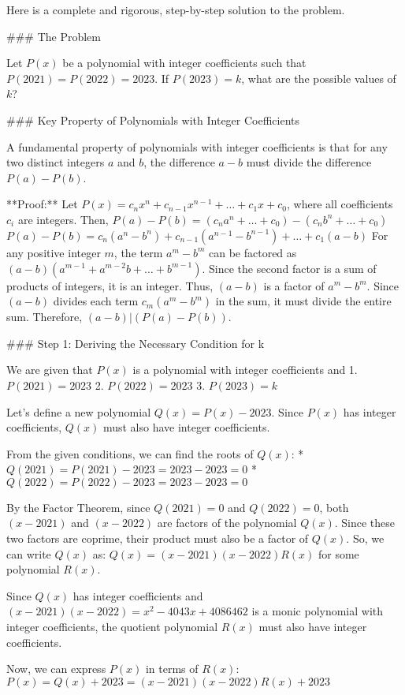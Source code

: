 Here is a complete and rigorous, step-by-step solution to the problem.

### The Problem

Let $P(x)$ be a polynomial with integer coefficients such that $P(2021) = P(2022) = 2023$. If $P(2023) = k$, what are the possible values of $k$?

### Key Property of Polynomials with Integer Coefficients

A fundamental property of polynomials with integer coefficients is that for any two distinct integers $a$ and $b$, the difference $a-b$ must divide the difference $P(a) - P(b)$.

**Proof:** Let $P(x) = c_n x^n + c_{n-1} x^{n-1} + \dots + c_1 x + c_0$, where all coefficients $c_i$ are integers.
Then,
$P(a) - P(b) = (c_n a^n + \dots + c_0) - (c_n b^n + \dots + c_0)$
$P(a) - P(b) = c_n(a^n - b^n) + c_{n-1}(a^{n-1} - b^{n-1}) + \dots + c_1(a - b)$
For any positive integer $m$, the term $a^m - b^m$ can be factored as $(a-b)(a^{m-1} + a^{m-2}b + \dots + b^{m-1})$. Since the second factor is a sum of products of integers, it is an integer. Thus, $(a-b)$ is a factor of $a^m - b^m$.
Since $(a-b)$ divides each term $c_m(a^m - b^m)$ in the sum, it must divide the entire sum. Therefore, $(a-b) | (P(a) - P(b))$.

### Step 1: Deriving the Necessary Condition for k

We are given that $P(x)$ is a polynomial with integer coefficients and
1.  $P(2021) = 2023$
2.  $P(2022) = 2023$
3.  $P(2023) = k$

Let's define a new polynomial $Q(x) = P(x) - 2023$. Since $P(x)$ has integer coefficients, $Q(x)$ must also have integer coefficients.

From the given conditions, we can find the roots of $Q(x)$:
*   $Q(2021) = P(2021) - 2023 = 2023 - 2023 = 0$
*   $Q(2022) = P(2022) - 2023 = 2023 - 2023 = 0$

By the Factor Theorem, since $Q(2021) = 0$ and $Q(2022) = 0$, both $(x-2021)$ and $(x-2022)$ are factors of the polynomial $Q(x)$. Since these two factors are coprime, their product must also be a factor of $Q(x)$.
So, we can write $Q(x)$ as:
$Q(x) = (x-2021)(x-2022)R(x)$
for some polynomial $R(x)$.

Since $Q(x)$ has integer coefficients and $(x-2021)(x-2022) = x^2 - 4043x + 4086462$ is a monic polynomial with integer coefficients, the quotient polynomial $R(x)$ must also have integer coefficients.

Now, we can express $P(x)$ in terms of $R(x)$:
$P(x) = Q(x) + 2023 = (x-2021)(x-2022)R(x) + 2023$

